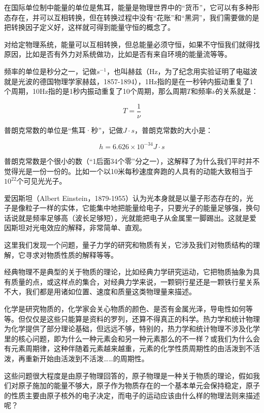 在国际单位制中能量的单位是焦耳，能量是物理世界中的“货币”，它可以有多种形态存在，并可以互相转换，但在转换过程中没有“花账”和“黑洞”，我们需要做的是把转换因子定义好，这样就可得到能量守恒的概念了。

对给定物理系统，能量可以互相转换，但总能量必须守恒，如果不守恒我们就得找原因，比如是否有外力对系统做功，比如是否有来自环境的能量流等等。

频率的单位是秒分之一，记做$s^{-1}$，也叫赫兹（Hz，为了纪念用实验证明了电磁波就是光波的德国物理学家赫兹，1857-1894），1Hz指的是在一秒钟内振动重复了1个周期，10Hz指的是1秒内振动重复了10个周期，那么周期$T$和频率$\nu$的关系就是：

\begin{equation}
T = \frac{1}{\nu}
\end{equation}

普朗克常数的单位是“焦耳·秒”，记做$J \cdot s$，普朗克常数的大小是：

\begin{equation}
h = 6.626 \times 10^{-34} J \cdot s
\end{equation}

普朗克常数是个很小的数（“1后面34个零”分之一），这解释了为什么我们平时并不觉得光是一份一份的。比如一个以10米每秒速度奔跑的人具有的动能大致相当于$10^22$个可见光光子。

爱因斯坦（Albert Einstein，1879-1955）认为光本身就是以量子形态存在的，光子是像粒子一样的实体，它能集中地把能量给电子，只要光子的能量足够强，换句话说就是频率足够高（波长足够短），光就能把电子从金属里一脚踢出。这就是爱因斯坦对光电效应的解释，非常简单、直观。

这里我们发现一个问题，量子力学的研究和物质有关，它涉及我们对物质结构的理解，它寻求对物质性质的解释等等。

经典物理不是典型的关于物质的理论，比如经典力学研究运动，它把物质抽象为具有质量的点，或这样点的集合，对经典力学来说，一颗铜行星还是一颗铁行星关系不大，我们都是用诸如位置、速度和质量这类物理量来描述。

化学是研究物质的，化学家会关心物质的颜色、是否有金属光泽，导电性如何等等。但仅仅是这些只能算是资料的罗列，还算不得真正的科学。热力学和统计物理为化学提供了部分理论基础，但远远不够，特别的，热力学和统计物理不涉及化学里的核心问题，即为什么一种元素会和另一种元素那么的不一样？或我们为什么会有元素周期律，这种伴随着元素越来越重，元素的化学性质周期性的由活泼到不活泼，再重新开始由活泼到不活泼……的周期性。

这些问题很大程度是由原子物理回答的，原子物理是一种关于物质的理论，假如我们对原子施加的能量不够大，原子作为物质存在的一个基本单元会保持稳定，原子的性质主要由原子核外的电子决定，而电子的运动应该由什么样的物理法则来描述呢？

